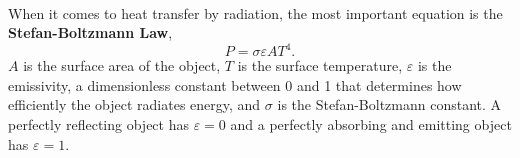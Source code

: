 \documentclass[../thermodynamics.tex]{subfiles}
\begin{document}
        \paragraph{}
        When it comes to heat transfer by radiation, the most important equation is the \textbf{Stefan-Boltzmann Law},
        \begin{equation}
            P=\sigma\varepsilon AT^4.
        \end{equation}
        $A$ is the surface area of the object, $T$ is the surface temperature, $\varepsilon$ is the emissivity, a dimensionless constant between 0 and 1 that determines how efficiently the object radiates energy, and $\sigma$ is the Stefan-Boltzmann constant.
        A perfectly reflecting object has $\varepsilon=0$ and a perfectly absorbing and emitting object has $\varepsilon=1$.
\end{document}
